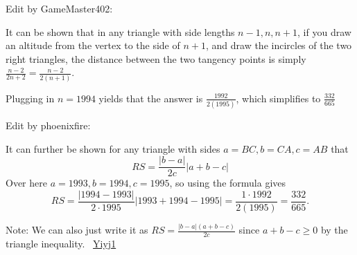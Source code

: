\begin{enumerate}
 Edit by GameMaster402: 

 It can be shown that in any triangle with side lengths $n-1, n, n+1$, if you draw an altitude from the vertex to the side of $n+1$, and draw the incircles of the two right triangles, the distance between the two tangency points is simply $\frac{n-2}{2n+2}=\frac{n-2}{2(n+1)}$.

 Plugging in $n=1994$ yields that the answer is $\frac{1992}{2(1995)}$, which simplifies to $\frac{332}{665}$

 Edit by phoenixfire:

 It can further be shown for any triangle with sides $a=BC, b=CA, c=AB$ that
 \[RS=\dfrac{|b-a|}{2c}|a+b-c|\]Over here $a=1993, b=1994, c=1995$, so using the formula gives 
 \[RS = \dfrac{|1994 - 1993|}{2 \cdot 1995}|1993 + 1994 - 1995| = \dfrac{1 \cdot 1992}{2(1995)} = \frac{332}{665}.\]

 Note: We can also just write it as $RS=\frac{|b-a|(a+b-c)}{2c}$ since $a+b-c \geq 0$ by the triangle inequality. ~\href{https://artofproblemsolving.com/wiki/index.php?title=User:Yiyj1&action=edit&redlink=1}{Yiyj1}

 


\end{enumerate}